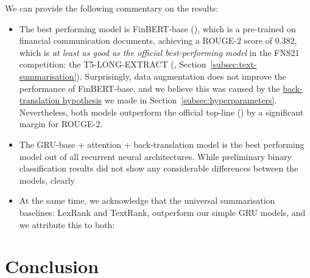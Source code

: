 We can provide the following commentary on the results:
\begin{itemize}
    \item The best performing model is FinBERT-base (\cite{yang2020finbert}), which is a pre-trained on financial communication documents,
        achieving a ROUGE-2 score of $0.382$, which is \emph{at least as good as the official best-performing model} in the FNS21 competition:
        the T5-LONG-EXTRACT (\cite{orzhenovskii-2021-t5}, Section~\ref{subsec:text-summarisation}).
        Surprisingly, data augmentation does not improve the performance of FinBERT-base, and we believe this was caused by
        the \hyperlink{data_augment_hypothesis}{back-translation hypothesis} we made in Section~\ref{subsec:hyperparameters}.
        Nevertheless, both models outperform the official top-line (\cite{litvak-last-2013-multilingual}) by a significant margin for ROUGE-2.
    \item The GRU-base + attention + back-translation model is the best performing model out of all recurrent neural architectures.
    While preliminary binary classification results did not show any considerable differences between the models, clearly
    \item At the same time, we acknowledge that the universal summarisation baselines: LexRank and TextRank, outperform
        our simple GRU models, and we attribute this to both:
\end{itemize}

\section{Conclusion}\label{sec:conclusion}